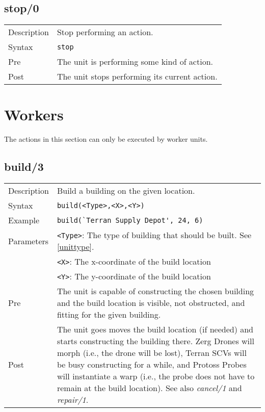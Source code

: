 \subsection{stop/0}
\begin{tabularx}{\textwidth}{lX}
 Description & Stop performing an action. \\
 Syntax & \verb|stop| \\
 Pre & The unit is performing some kind of action. \\
 Post & The unit stops performing its current action.
\end{tabularx}

\newpage

\section{Workers}
The actions in this section can only be executed by worker units.

\subsection{build/3}
\begin{tabularx}{\textwidth}{lX}
 Description & Build a building on the given location. \\
 Syntax & \verb|build(<Type>,<X>,<Y>)| \\
 Example & \verb|build(`Terran Supply Depot', 24, 6)| \\
 Parameters & \verb|<Type>|: The type of building that should be built. See \ref{unittype}. \\
            & \verb|<X>|: The x-coordinate of the build location \\
            & \verb|<Y>|: The y-coordinate of the build location \\
 Pre & The unit is capable of constructing the chosen building and the build location is visible, not obstructed, and fitting for the given building. \\
 Post & The unit goes moves the build location (if needed) and starts constructing the building there. Zerg Drones will morph (i.e., the drone will be lost), Terran SCVs will be busy constructing for a while, and Protoss Probes will instantiate a warp (i.e., the probe does not have to remain at the build location). See also \textit{cancel/1} and \textit{repair/1}.
\end{tabularx}

